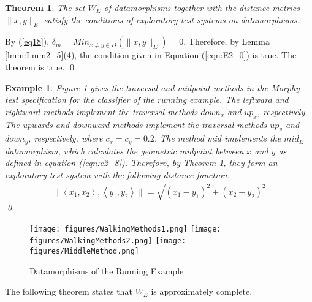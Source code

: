 \documentclass[preprint,1p,authoryear,times]{elsarticle}
\newtheorem{Theorem} {Theorem}
\newtheorem{Example}{Example}
\begin{document}
\begin{Theorem}\label{thm:Thm2_5}
The set $W_E$ of datamorphisms together with the distance metrics $\|x,y\|_E$ satisfy the conditions of exploratory test systems on datamorphisms. 
\end{Theorem}
By (\ref{eq18}), $\delta_m = Min_{x \neq y \in D}\left(\|x,y\|_E\right) = 0$. Therefore, by Lemma \ref{lmm:Lmm2_5}(4), the condition given in Equation (\ref{eqn:E2_0}) is true. The theorem is true. \qed

\begin{Example} \label{RunningExampleTestSystem}
Figure \ref{fig:WalkingMethods} gives the traversal and midpoint methods in the Morphy test specification for the classifier of the running example. The \emph{leftward} and \emph{rightward} methods implement the traversal methods $down_x$ and $up_x$, respectively. The \emph{upwards} and \emph{downward} methods implement the traversal methods $up_y$ and $down_y$, respectively, where $c_x = c_y = 0.2$. The method \emph{mid} implements the $mid_E$ datamorphism, which calculates the geometric midpoint between $x$ and $y$ as defined in equation (\ref{eqn:e2_8}). Therefore, by Theorem \ref{thm:Thm2_5}, they form an exploratory test system with the following distance function.
\begin{eqnarray*}
\|\left<x_1, x_2\right>, \left<y_1, y_2\right>\| = \sqrt{(x_1 - y_1)^2 + (x_2 - y_2)^2}
\end{eqnarray*} \qed
\end{Example}

\begin{figure}[htbp]
	\centering
	\texttt{[image: figures/WalkingMethods1.png]}
	\texttt{[image: figures/WalkingMethods2.png]}
	\texttt{[image: figures/MiddleMethod.png]}
%	
	\caption{Datamorphisms of the Running Example}
	\label{fig:WalkingMethods}
\end{figure}

The following theorem states that $W_E$ is approximately complete. 
\end{document}
